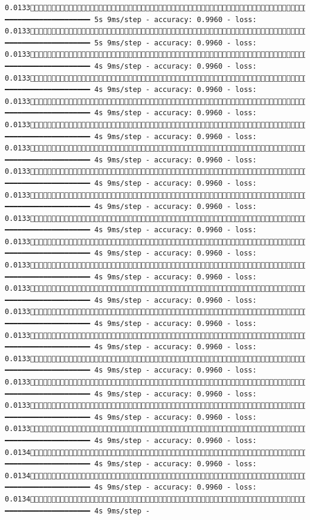 \documentclass[
  letterpaper,
  DIV=11,
  numbers=noendperiod]{scrreprt}
\begin{document}
\begin{verbatim}
0.01331311/1875 ━━━━━━━━━━━━━━━━━━━━ 5s 9ms/step - accuracy: 0.9960 - loss: 0.01331316/1875 ━━━━━━━━━━━━━━━━━━━━ 5s 9ms/step - accuracy: 0.9960 - loss: 0.01331321/1875 ━━━━━━━━━━━━━━━━━━━━ 4s 9ms/step - accuracy: 0.9960 - loss: 0.01331326/1875 ━━━━━━━━━━━━━━━━━━━━ 4s 9ms/step - accuracy: 0.9960 - loss: 0.01331331/1875 ━━━━━━━━━━━━━━━━━━━━ 4s 9ms/step - accuracy: 0.9960 - loss: 0.01331335/1875 ━━━━━━━━━━━━━━━━━━━━ 4s 9ms/step - accuracy: 0.9960 - loss: 0.01331339/1875 ━━━━━━━━━━━━━━━━━━━━ 4s 9ms/step - accuracy: 0.9960 - loss: 0.01331343/1875 ━━━━━━━━━━━━━━━━━━━━ 4s 9ms/step - accuracy: 0.9960 - loss: 0.01331347/1875 ━━━━━━━━━━━━━━━━━━━━ 4s 9ms/step - accuracy: 0.9960 - loss: 0.01331351/1875 ━━━━━━━━━━━━━━━━━━━━ 4s 9ms/step - accuracy: 0.9960 - loss: 0.01331355/1875 ━━━━━━━━━━━━━━━━━━━━ 4s 9ms/step - accuracy: 0.9960 - loss: 0.01331360/1875 ━━━━━━━━━━━━━━━━━━━━ 4s 9ms/step - accuracy: 0.9960 - loss: 0.01331365/1875 ━━━━━━━━━━━━━━━━━━━━ 4s 9ms/step - accuracy: 0.9960 - loss: 0.01331371/1875 ━━━━━━━━━━━━━━━━━━━━ 4s 9ms/step - accuracy: 0.9960 - loss: 0.01331377/1875 ━━━━━━━━━━━━━━━━━━━━ 4s 9ms/step - accuracy: 0.9960 - loss: 0.01331383/1875 ━━━━━━━━━━━━━━━━━━━━ 4s 9ms/step - accuracy: 0.9960 - loss: 0.01331389/1875 ━━━━━━━━━━━━━━━━━━━━ 4s 9ms/step - accuracy: 0.9960 - loss: 0.01331395/1875 ━━━━━━━━━━━━━━━━━━━━ 4s 9ms/step - accuracy: 0.9960 - loss: 0.01331401/1875 ━━━━━━━━━━━━━━━━━━━━ 4s 9ms/step - accuracy: 0.9960 - loss: 0.01341404/1875 ━━━━━━━━━━━━━━━━━━━━ 4s 9ms/step - accuracy: 0.9960 - loss: 0.01341408/1875 ━━━━━━━━━━━━━━━━━━━━ 4s 9ms/step - accuracy: 0.9960 - loss: 0.01341413/1875 ━━━━━━━━━━━━━━━━━━━━ 4s 9ms/step - 
\end{verbatim}
\end{document}
